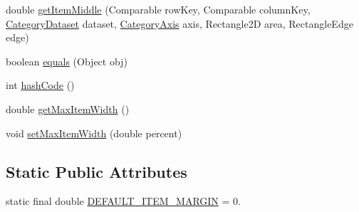 \begin{DoxyCompactItemize}
\item 
double \mbox{\hyperlink{classorg_1_1jfree_1_1chart_1_1renderer_1_1category_1_1_level_renderer_ab924d6e4e1c1098d6c0a0ac6f378cb42}{get\+Item\+Middle}} (Comparable row\+Key, Comparable column\+Key, \mbox{\hyperlink{interfaceorg_1_1jfree_1_1data_1_1category_1_1_category_dataset}{Category\+Dataset}} dataset, \mbox{\hyperlink{classorg_1_1jfree_1_1chart_1_1axis_1_1_category_axis}{Category\+Axis}} axis, Rectangle2D area, Rectangle\+Edge edge)
\item 
boolean \mbox{\hyperlink{classorg_1_1jfree_1_1chart_1_1renderer_1_1category_1_1_level_renderer_a6bb8b3e63e9d80be64382e521ba4d7f1}{equals}} (Object obj)
\item 
int \mbox{\hyperlink{classorg_1_1jfree_1_1chart_1_1renderer_1_1category_1_1_level_renderer_a8fe10a5244da667aaea7695b3096da71}{hash\+Code}} ()
\item 
double \mbox{\hyperlink{classorg_1_1jfree_1_1chart_1_1renderer_1_1category_1_1_level_renderer_a1953acdda4493fca8a9af2ee0f793e8e}{get\+Max\+Item\+Width}} ()
\item 
void \mbox{\hyperlink{classorg_1_1jfree_1_1chart_1_1renderer_1_1category_1_1_level_renderer_a20c2015dac7a28199026fb6a871d650b}{set\+Max\+Item\+Width}} (double percent)
\end{DoxyCompactItemize}
\subsection*{Static Public Attributes}
\begin{DoxyCompactItemize}
\item 
static final double \mbox{\hyperlink{classorg_1_1jfree_1_1chart_1_1renderer_1_1category_1_1_level_renderer_acae2dc45bac7bf719d988c6f595b92bb}{D\+E\+F\+A\+U\+L\+T\+\_\+\+I\+T\+E\+M\+\_\+\+M\+A\+R\+G\+IN}} = 0.
\end{DoxyCompactItemize}
